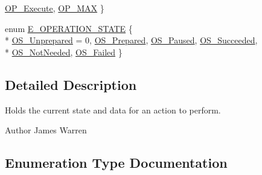 \begin{DoxyCompactItemize}
\hyperlink{_operation_8h_a29c331c24eda38b81f1e27a40391a589a88386499a6ffb813d3d2c9ccbd49e3f6}{O\-P\-\_\-\-Execute}, 
\hyperlink{_operation_8h_a29c331c24eda38b81f1e27a40391a589a5c270cf3e25cfa83f27b787be93b99f9}{O\-P\-\_\-\-M\-A\-X}
 \}
\item 
enum \hyperlink{_operation_8h_ac3f77f49db5f357de93e5a22bc2f601f}{E\-\_\-\-O\-P\-E\-R\-A\-T\-I\-O\-N\-\_\-\-S\-T\-A\-T\-E} \{ \\*
\hyperlink{_operation_8h_ac3f77f49db5f357de93e5a22bc2f601fa3cc3ca28d6dcb189d3e8ca980b98bba8}{O\-S\-\_\-\-Unprepared} = 0, 
\hyperlink{_operation_8h_ac3f77f49db5f357de93e5a22bc2f601fa3235cb67cc5fcb5cd4c1896c0cbb0ed5}{O\-S\-\_\-\-Prepared}, 
\hyperlink{_operation_8h_ac3f77f49db5f357de93e5a22bc2f601fadaa7a63a2815034acf71b0eec28d8d8f}{O\-S\-\_\-\-Paused}, 
\hyperlink{_operation_8h_ac3f77f49db5f357de93e5a22bc2f601fabddec909ae1b6efec396721fbb374ae6}{O\-S\-\_\-\-Succeeded}, 
\\*
\hyperlink{_operation_8h_ac3f77f49db5f357de93e5a22bc2f601fa8746c61c4f80d56290eb03087db8d512}{O\-S\-\_\-\-Not\-Needed}, 
\hyperlink{_operation_8h_ac3f77f49db5f357de93e5a22bc2f601fa76b112a68b6c56383c6f04327844ed1f}{O\-S\-\_\-\-Failed}
 \}
\end{DoxyCompactItemize}


\subsection{Detailed Description}
Holds the current state and data for an action to perform. \begin{DoxyAuthor}{Author}
James Warren 
\end{DoxyAuthor}


\subsection{Enumeration Type Documentation}
